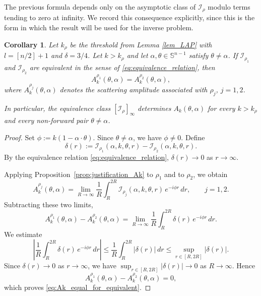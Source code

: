 \documentclass[12pt,a4paper]{amsart}
\numberwithin{equation}{section}
\theoremstyle{plain}
\newtheorem{corollary}[theorem]{Corollary}
\theoremstyle{definition}
\begin{document}
The previous formula depends only on the asymptotic class of
$\mathcal I_\rho$ modulo terms tending to zero at infinity. We record this
consequence explicitly, since this is the form in which the result will be used for the inverse problem.

\begin{corollary}\label{cor:equivalence_class_determines_Ak}
Let $k_\rho$ be the threshold from Lemma \ref{lem_LAP} with $l=[n/2]+1$ and $\delta=3/4$. Let $k>k_\rho$ and let $\alpha,\theta\in\mathbb{S}^{n-1}$ satisfy $\theta\neq\alpha$.
If $\mathcal{I}_{\rho_1}$ and $\mathcal{I}_{\rho_2}$ are equivalent in the sense of \eqref{eq:equivalence_relation}, then
\begin{equation}\label{eq:Ak_equal_for_equivalent}
    A_k^{\rho_1}(\theta,\alpha) = A_k^{\rho_2}(\theta,\alpha),
\end{equation}
where $A_k^{\rho_j}(\theta,\alpha)$ denotes the scattering amplitude associated with $\rho_j$, $j=1,2$.

In particular, the equivalence class $[\mathcal I_\rho]_\infty$ determines
$A_k(\theta,\alpha)$ for every $k>k_\rho$ and every non-forward pair
$\theta\ne\alpha$.
\end{corollary}

\begin{proof}
Set $\phi := k(1-\alpha\cdot\theta)$. Since $\theta\neq\alpha$, we have $\phi\neq 0$.
Define
\begin{equation*}
    \delta(r) := \mathcal{I}_{\rho_1}(\alpha,k,\theta,r) - \mathcal{I}_{\rho_2}(\alpha,k,\theta,r).
\end{equation*}
By the equivalence relation \eqref{eq:equivalence_relation}, $\delta(r) \to 0$ as $r\to\infty$.

Applying Proposition~\ref{prop:justification_Ak} to $\rho_1$ and to $\rho_2$, we obtain
\begin{equation*}
    A_k^{\rho_j}(\theta,\alpha)
    =
    \lim_{R\to\infty}
    \frac{1}{R}\int_R^{2R}
    \mathcal{I}_{\rho_j}(\alpha,k,\theta,r)\,e^{-i\phi r}\,dr,
    \qquad j=1,2.
\end{equation*}
Subtracting these two limits,
\begin{equation*}
    A_k^{\rho_1}(\theta,\alpha) - A_k^{\rho_2}(\theta,\alpha)
    =
    \lim_{R\to\infty}
    \frac{1}{R}\int_R^{2R}
    \delta(r)\,e^{-i\phi r}\,dr.
\end{equation*}
We estimate
\begin{equation*}
    \left|
        \frac{1}{R}\int_R^{2R}\delta(r)\,e^{-i\phi r}\,dr
    \right|
    \le
    \frac{1}{R}\int_R^{2R}|\delta(r)|\,dr
    \le
    \sup_{r\in[R,2R]}|\delta(r)|.
\end{equation*}
Since $\delta(r)\to 0$ as $r\to\infty$, we have $\sup_{r\in[R,2R]}|\delta(r)|\to 0$ as $R\to\infty$. Hence
\begin{equation*}
    A_k^{\rho_1}(\theta,\alpha) - A_k^{\rho_2}(\theta,\alpha) = 0,
\end{equation*}
which proves \eqref{eq:Ak_equal_for_equivalent}.
\end{proof}
\end{document}
